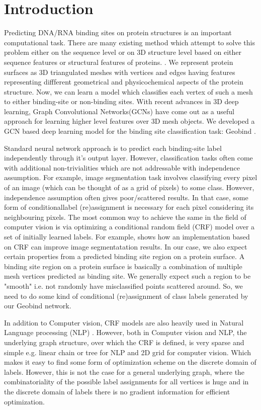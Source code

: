 \section{Introduction} Predicting DNA/RNA binding sites on protein structures is an important
computational task.  There are many existing method which attempt to solve this problem either on
the sequence level or on 3D structure level based on either sequence features or structural features
of proteins. . We  represent protein surfaces as 3D triangulated meshes with 
vertices and edges having features representing diffferent geometrical and physicochemical aspects
of the protein structure. Now, we can learn a model which classifies each vertex of such a mesh to either binding-site or
non-binding sites. With recent advances in 3D deep learning, Graph Convolutional
Networks(GCNs) have come out as a useful approach for learning higher level features over
3D mesh objects. We developed a GCN based deep learning model for the binding site classification
task: Geobind .

Standard neural network approach is to predict each binding-site label independently
through it's output layer. However, classification tasks often come with additional non-trivialities which
are not addressable with independence assumption.  For example, image segmentation task involves
classifying every pixel of an image (which can be thought of as a grid of pixels) to some class.
However, independence assumption often gives poor/scattered results. In that case, some form of
conditionallabel (re)assignment is necessary for each pixel considering its neighbouring pixels. The
most common way to achieve the same in the field of computer vision is via optimizing a conditional
random  field (CRF) model over a set of initially  learned labels. For example,  shows how an implementation based on CRF can improve image
segmentatation results. In our case, we also expect certain properties from a predicted binding site
region on a protein surface. A binding site region on a protein surface is basically a combination
of multiple mesh vertices predicted as binding site. We generally expect such a region to be
"smooth" i.e. not randomly have misclassified points scattered around. So, we need to do some kind
of conditional (re)assignment of class labels generated by our Geobind network.

In addition to Computer vision, CRF models are also heavily used in Natural Language processing (NLP)
\citep{roark2004discriminative,mccallum2003early,liu2017identification}. However, both in Computer
vision and NLP, the underlying graph structure, over which the CRF is defined, is very sparse and
simple e.g. linear chain or tree for NLP and 2D grid for computer vision. Which makes it easy to
find some form of optimization scheme on the discrete domain of labels. However, this is not the
case for a general underlying graph, where the combinatoriality of the possible label assignments
for all vertices is huge and in the discrete domain of labels there is no gradient information for
efficient optimization.

